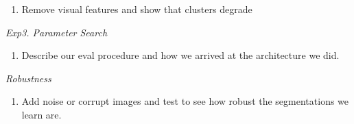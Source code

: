 \documentclass[0-main.tex]{subfiles}
\begin{document}
\begin{enumerate}
\item Remove visual features and show that clusters degrade
\end{enumerate}

\noindent \textit{Exp3. Parameter Search}

\begin{enumerate}
\item Describe our eval procedure and how we arrived at the architecture we did.
\end{enumerate}

\noindent \textit{Robustness}
\begin{enumerate}
\item Add noise or corrupt images and test to see how robust the segmentations we learn are.
\end{enumerate}
\fi

\end{document}
